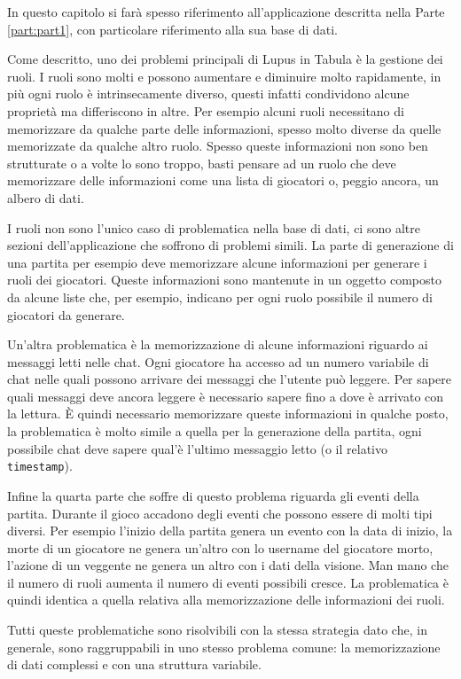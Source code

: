 In questo capitolo si farà spesso riferimento all'applicazione descritta nella Parte \ref{part:part1}, con particolare riferimento alla sua base di dati.

Come descritto, uno dei problemi principali di Lupus in Tabula è la gestione dei ruoli. I ruoli sono molti e possono aumentare e diminuire molto rapidamente, in più ogni ruolo è intrinsecamente diverso, questi infatti condividono alcune proprietà ma differiscono in altre. Per esempio alcuni ruoli necessitano di memorizzare da qualche parte delle informazioni, spesso molto diverse da quelle memorizzate da qualche altro ruolo. Spesso queste informazioni non sono ben strutturate o a volte lo sono troppo, basti pensare ad un ruolo che deve memorizzare delle informazioni come una lista di giocatori o, peggio ancora, un albero di dati.

I ruoli non sono l'unico caso di problematica nella base di dati, ci sono altre sezioni dell'applicazione che soffrono di problemi simili. La parte di generazione di una partita per esempio deve memorizzare alcune informazioni per generare i ruoli dei giocatori. Queste informazioni sono mantenute in un oggetto composto da alcune liste che, per esempio, indicano per ogni ruolo possibile il numero di giocatori da generare.

Un'altra problematica è la memorizzazione di alcune informazioni riguardo ai messaggi letti nelle chat. Ogni giocatore ha accesso ad un numero variabile di chat nelle quali possono arrivare dei messaggi che l'utente può leggere. Per sapere quali messaggi deve ancora leggere è necessario sapere fino a dove è arrivato con la lettura. È quindi necessario memorizzare queste informazioni in qualche posto, la problematica è molto simile a quella per la generazione della partita, ogni possibile chat deve sapere qual'è l'ultimo messaggio letto (o il relativo \texttt{timestamp}).

Infine la quarta parte che soffre di questo problema riguarda gli eventi della partita. Durante il gioco accadono degli eventi che possono essere di molti tipi diversi. Per esempio l'inizio della partita genera un evento con la data di inizio, la morte di un giocatore ne genera un'altro con lo username del giocatore morto, l'azione di un veggente ne genera un altro con i dati della visione. Man mano che il numero di ruoli aumenta il numero di eventi possibili cresce. La problematica è quindi identica a quella relativa alla memorizzazione delle informazioni dei ruoli.

Tutti queste problematiche sono risolvibili con la stessa strategia dato che, in generale, sono raggruppabili in uno stesso problema comune: la memorizzazione di dati complessi e con una struttura variabile.